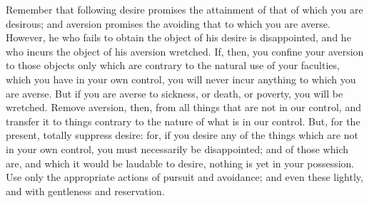Remember that following desire promises the attainment of that
of which you are desirous; and aversion promises the avoiding that
to which you are averse. However, he who fails to obtain the object
of his desire is disappointed, and he who incurs the object of his
aversion wretched. If, then, you confine your aversion to those objects
only which are contrary to the natural use of your faculties, which
you have in your own control, you will never incur anything to which
you are averse. But if you are averse to sickness, or death, or poverty,
you will be wretched. Remove aversion, then, from all things that
are not in our control, and transfer it to things contrary to the
nature of what is in our control. But, for the present, totally suppress
desire: for, if you desire any of the things which are not in your
own control, you must necessarily be disappointed; and of those which
are, and which it would be laudable to desire, nothing is yet in your
possession. Use only the appropriate actions of pursuit and avoidance;
and even these lightly, and with gentleness and reservation.
